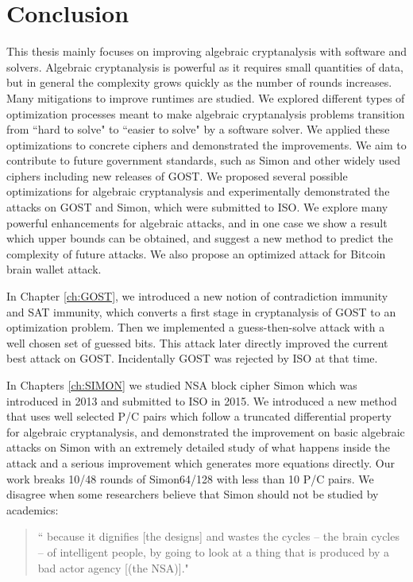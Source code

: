 \chapter{Conclusion}
\label{chapterlabel4}

This thesis mainly focuses on improving algebraic cryptanalysis with software and solvers. Algebraic cryptanalysis is powerful as it requires small quantities of data, but in general the complexity grows quickly as the number of rounds increases. Many mitigations to improve runtimes are studied. 
We explored different types of optimization processes meant to make algebraic cryptanalysis problems transition from ``hard to solve" to ``easier to solve" by a software solver. We applied these optimizations to concrete ciphers and demonstrated the improvements. We aim to contribute to future government standards, such as Simon and other widely used ciphers including new releases of GOST.  We proposed several possible optimizations for algebraic cryptanalysis and experimentally demonstrated the attacks on GOST and Simon, which were submitted to ISO. We explore many powerful enhancements for algebraic attacks, and in one case we show a result which upper bounds can be obtained, and suggest a new method to predict the complexity of future attacks. 
We also propose an optimized attack for Bitcoin brain wallet attack.  

In Chapter \ref{ch:GOST}, we introduced a new notion of contradiction immunity and SAT immunity, which converts a first stage in cryptanalysis of GOST to an optimization problem. Then we implemented a guess-then-solve attack with a well chosen set of guessed bits. This attack later directly improved the current best attack on GOST. Incidentally GOST was rejected by ISO at that time. 

In Chapters \ref{ch:SIMON} we studied NSA block cipher Simon which was introduced in 2013 and submitted to ISO in 2015. 
We introduced a new method that uses well selected P/C pairs which follow a truncated differential property for algebraic cryptanalysis, and demonstrated the improvement on basic algebraic attacks on Simon with an extremely detailed study of what happens inside the attack and a serious improvement which generates more equations directly. Our work breaks 10/48 rounds of Simon64/128 with less than 10 P/C pairs.
We disagree when some researchers believe that Simon should not be studied by academics: 

\begin{quotation}
	``%
	because it dignifies [the designs] and wastes the cycles – the brain cycles – of intelligent people, by going to look at a thing that is produced by a bad actor agency [(the NSA)]." \\ 
\end{quotation}

